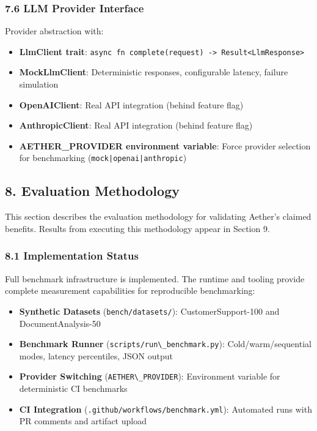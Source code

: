 \documentclass[
]{article}
\newcommand{\passthrough}[1]{#1}
\providecommand{\tightlist}{%
  \setlength{\itemsep}{0pt}\setlength{\parskip}{0pt}}
\begin{document}
\subsubsection{7.6 LLM Provider Interface}\label{llm-provider-interface}

Provider abstraction with:

\begin{itemize}
\tightlist
\item
  \textbf{LlmClient trait}:
  \passthrough{\lstinline!async fn complete(request) -> Result<LlmResponse>!}
\item
  \textbf{MockLlmClient}: Deterministic responses, configurable latency,
  failure simulation
\item
  \textbf{OpenAIClient}: Real API integration (behind feature flag)
\item
  \textbf{AnthropicClient}: Real API integration (behind feature flag)
\item
  \textbf{AETHER\_PROVIDER environment variable}: Force provider
  selection for benchmarking
  (\passthrough{\lstinline!mock|openai|anthropic!})
\end{itemize}

\subsection{8. Evaluation Methodology}\label{evaluation-methodology}

This section describes the evaluation methodology for validating
Aether's claimed benefits. Results from executing this methodology
appear in Section 9.

\subsubsection{8.1 Implementation Status}\label{implementation-status}

Full benchmark infrastructure is implemented. The runtime and tooling
provide complete measurement capabilities for reproducible benchmarking:

\begin{itemize}
\tightlist
\item
  \textbf{Synthetic Datasets}
  (\passthrough{\lstinline!bench/datasets/!}): CustomerSupport-100 and
  DocumentAnalysis-50
\item
  \textbf{Benchmark Runner}
  (\passthrough{\lstinline!scripts/run\_benchmark.py!}):
  Cold/warm/sequential modes, latency percentiles, JSON output
\item
  \textbf{Provider Switching}
  (\passthrough{\lstinline!AETHER\_PROVIDER!}): Environment variable for
  deterministic CI benchmarks
\item
  \textbf{CI Integration}
  (\passthrough{\lstinline!.github/workflows/benchmark.yml!}): Automated
  runs with PR comments and artifact upload
\end{itemize}
\end{document}
